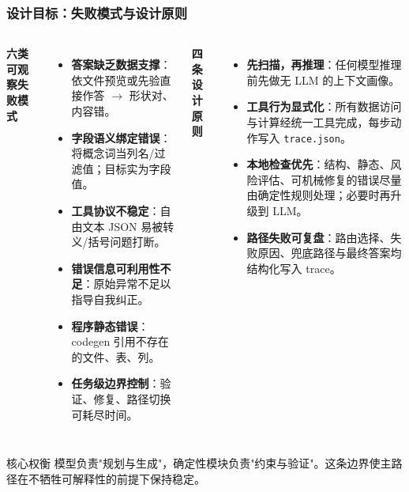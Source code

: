 \documentclass[11pt, aspectratio=169]{beamer}
\begin{document}
\begin{frame}
\frametitle{设计目标：失败模式与设计原则}

\footnotesize
\begin{columns}[T]
\textbf{六类可观察失败模式}
\begin{itemize}
    \setlength\itemsep{0.1em}
    \item \textbf{答案缺乏数据支撑}：依文件预览或先验直接作答 $\to$ 形状对、内容错。
    \item \textbf{字段语义绑定错误}：将概念词当列名/过滤值；目标实为字段值。
    \item \textbf{工具协议不稳定}：自由文本 JSON 易被转义/括号问题打断。
    \item \textbf{错误信息可利用性不足}：原始异常不足以指导自我纠正。
    \item \textbf{程序静态错误}：codegen 引用不存在的文件、表、列。
    \item \textbf{任务级边界控制}：验证、修复、路径切换可耗尽时间。
\end{itemize}

\textbf{四条设计原则}
\begin{itemize}
    \setlength\itemsep{0.1em}
    \item \textbf{先扫描，再推理}：任何模型推理前先做无 LLM 的上下文画像。
    \item \textbf{工具行为显式化}：所有数据访问与计算经统一工具完成，每步动作写入 \texttt{trace.json}。
    \item \textbf{本地检查优先}：结构、静态、风险评估、可机械修复的错误尽量由确定性规则处理；必要时再升级到 LLM。
    \item \textbf{路径失败可复盘}：路由选择、失败原因、兜底路径与最终答案均结构化写入 trace。
\end{itemize}
\end{columns}

\vspace{0.4em}
\begin{block}{核心权衡}
\scriptsize
模型负责"规划与生成"，确定性模块负责"约束与验证"。这条边界使主路径在不牺牲可解释性的前提下保持稳定。
\end{block}

\end{frame}
\end{document}
